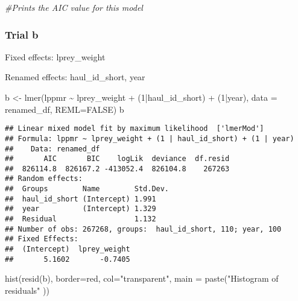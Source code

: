 \documentclass[
]{article}
\newenvironment{Shaded}{\begin{snugshade}}{\end{snugshade}}
\newcommand{\AttributeTok}[1]{\textcolor[rgb]{0.77,0.63,0.00}{#1}}
\newcommand{\CommentTok}[1]{\textcolor[rgb]{0.56,0.35,0.01}{\textit{#1}}}
\newcommand{\ConstantTok}[1]{\textcolor[rgb]{0.00,0.00,0.00}{#1}}
\newcommand{\DecValTok}[1]{\textcolor[rgb]{0.00,0.00,0.81}{#1}}
\newcommand{\FunctionTok}[1]{\textcolor[rgb]{0.00,0.00,0.00}{#1}}
\newcommand{\NormalTok}[1]{#1}
\newcommand{\OtherTok}[1]{\textcolor[rgb]{0.56,0.35,0.01}{#1}}
\newcommand{\SpecialCharTok}[1]{\textcolor[rgb]{0.00,0.00,0.00}{#1}}
\newcommand{\StringTok}[1]{\textcolor[rgb]{0.31,0.60,0.02}{#1}}
\begin{document}
\begin{Shaded}
\begin{Highlighting}[]
\CommentTok{\#Prints the AIC value for this model}
\end{Highlighting}
\end{Shaded}

\hypertarget{trial-b}{%
\subsubsection{Trial b}\label{trial-b}}

Fixed effects: lprey\_weight

Renamed effects: haul\_id\_short, year

\begin{Shaded}
\begin{Highlighting}[]
\NormalTok{b }\OtherTok{\textless{}{-}} \FunctionTok{lmer}\NormalTok{(lppmr }\SpecialCharTok{\textasciitilde{}}\NormalTok{ lprey\_weight }\SpecialCharTok{+}\NormalTok{ (}\DecValTok{1}\SpecialCharTok{|}\NormalTok{haul\_id\_short) }\SpecialCharTok{+}\NormalTok{ (}\DecValTok{1}\SpecialCharTok{|}\NormalTok{year), }\AttributeTok{data =}\NormalTok{ renamed\_df, }\AttributeTok{REML=}\ConstantTok{FALSE}\NormalTok{)}
\NormalTok{b}
\end{Highlighting}
\end{Shaded}

\begin{verbatim}
## Linear mixed model fit by maximum likelihood  ['lmerMod']
## Formula: lppmr ~ lprey_weight + (1 | haul_id_short) + (1 | year)
##    Data: renamed_df
##       AIC       BIC    logLik  deviance  df.resid 
##  826114.8  826167.2 -413052.4  826104.8    267263 
## Random effects:
##  Groups        Name        Std.Dev.
##  haul_id_short (Intercept) 1.991   
##  year          (Intercept) 1.329   
##  Residual                  1.132   
## Number of obs: 267268, groups:  haul_id_short, 110; year, 100
## Fixed Effects:
##  (Intercept)  lprey_weight  
##       5.1602       -0.7405
\end{verbatim}

\begin{Shaded}
\begin{Highlighting}[]
\FunctionTok{hist}\NormalTok{(}\FunctionTok{resid}\NormalTok{(b), }\AttributeTok{border=}\StringTok{\textquotesingle{}red\textquotesingle{}}\NormalTok{, }\AttributeTok{col=}\StringTok{"transparent"}\NormalTok{, }\AttributeTok{main =} \FunctionTok{paste}\NormalTok{(}\StringTok{"Histogram of residuals"}\NormalTok{ ))}
\end{Highlighting}
\end{Shaded}
\end{document}
